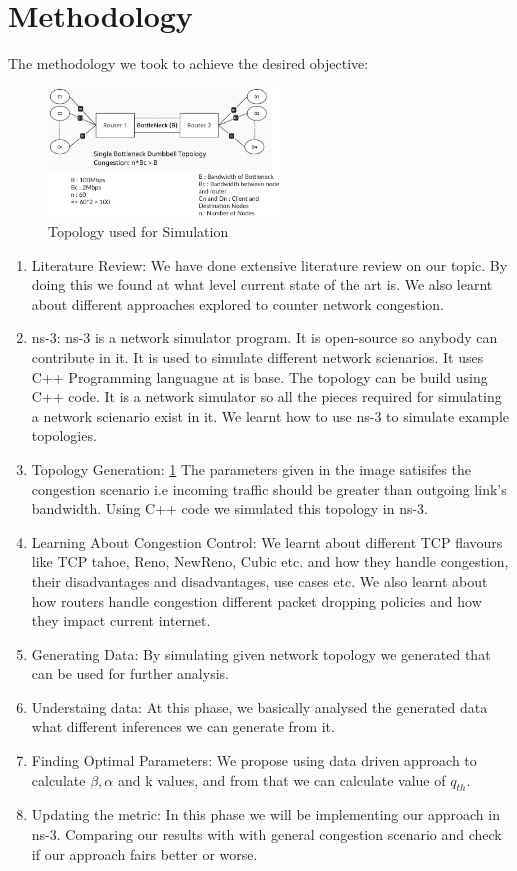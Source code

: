 \section{Methodology}
The methodology we took to achieve the desired objective:
\begin{figure}[h]
    \centering
    \includegraphics[width=0.55\textwidth]{topology.png}
    \caption{\label{fig:myfig2} Topology used for Simulation}
\end{figure}
\begin{enumerate}
    \item Literature Review: We have done extensive literature review on our topic. By doing this we found at what level current state of the art is. We also learnt about different approaches explored to counter network congestion.
    \item ns-3: ns-3 is a network simulator program. It is open-source so anybody can contribute in it. It is used to simulate different network scienarios. It uses C++ Programming languague at is base. The topology can be build using C++ code. It is a network simulator so all the pieces required for simulating a network scienario exist in it. We learnt how to use ns-3 to simulate example topologies.
    \item Topology Generation: \ref{fig:myfig2} The parameters given in the image satisifes the congestion scenario i.e incoming traffic should be greater than outgoing link's bandwidth. Using C++ code we simulated this topology in ns-3.
    \item Learning About Congestion Control: We learnt about different TCP flavours like TCP tahoe, Reno, NewReno, Cubic etc. and how they handle congestion, their disadvantages and disadvantages, use cases etc. We also learnt about how routers handle congestion different packet dropping policies and how they impact current internet.
    \item Generating Data: By simulating given network topology we generated that can be used for further analysis.
    \item Understaing data: At this phase, we basically analysed the generated data what different inferences we can generate from it.
    \item Finding Optimal Parameters: We propose using data driven approach to calculate \( \beta, \alpha \) and k values, and from that we can calculate value of \( q_{th} \). 
    \item Updating the metric: In this phase we will be implementing our approach in ns-3. Comparing our results with with general congestion scenario and check if our approach fairs better or worse.
\end{enumerate}

